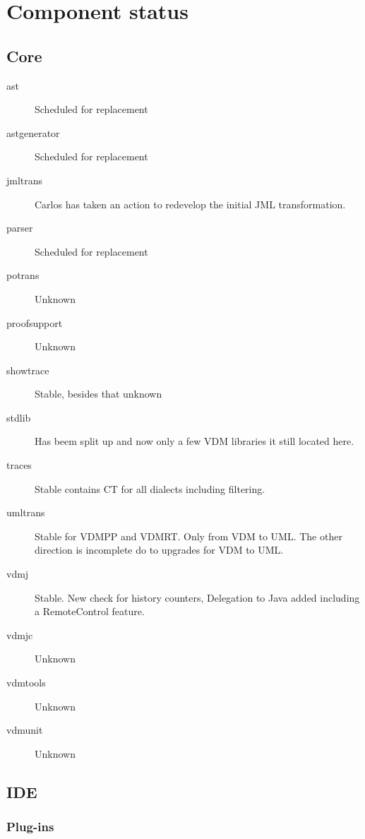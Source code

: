 \section{Component status}

\subsection{Core}
\begin{description}

\item[ast] Scheduled for replacement
\item[astgenerator] Scheduled for replacement
\item[jmltrans] Carlos has taken an action to redevelop the initial JML transformation.
\item[parser] Scheduled for replacement
\item[potrans] Unknown
\item[proofsupport] Unknown
\item[showtrace] Stable, besides that unknown
\item[stdlib] Has beem split up and now only a few VDM libraries it still located here.
\item[traces] Stable contains CT for all dialects including filtering. 
\item[umltrans] Stable for VDMPP and VDMRT. Only from VDM to UML. The other direction is incomplete do to upgrades for VDM to UML.
\item[vdmj] Stable. New check for history counters, Delegation to Java added including a RemoteControl feature.
\item[vdmjc] Unknown
\item[vdmtools] Unknown
\item[vdmunit] Unknown

\end{description}

\subsection{IDE}

\subsubsection{Plug-ins}

